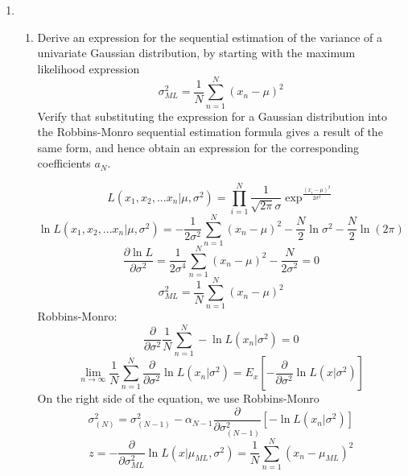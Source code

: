 \documentclass[a4paper]{article}
\begin{document}
\begin{enumerate}
		\item
		\begin{enumerate}
			\item
			Derive an expression for the sequential estimation of the variance of a univariate Gaussian distribution, by starting with the maximum likelihood expression
			$$
			\sigma_{ML}^2 = \frac{1}{N}\sum_{n=1}^{N}(x_n - \mu)^2
			$$
			Verify that substituting the expression for a Gaussian distribution into the Robbins-Monro sequential estimation formula gives a result of the same form, and hence obtain an expression for the corresponding coefficients $a_N$.
			\begin{solution}
				\begin{equation*}
					L(x_1,x_2,...x_n|\mu,\sigma^2)=\prod_{i=1}^{N}\frac{1}{\sqrt{2\pi}\sigma}\exp^{\frac{(x_i-\mu)^2}{2\sigma^2}}
				\end{equation*}
				\begin{equation*}
					\ln L(x_1,x_2,...x_n|\mu,\sigma^2)=-\frac{1}{2\sigma^2}\sum_{n=1}^{N}(x_n-\mu)^2-\frac{N}{2}\ln \sigma^2-\frac{N}{2}\ln (2\pi)
				\end{equation*}
				\begin{equation*}
					\frac{\partial \ln L}{\partial \sigma^2}=\frac{1}{2\sigma^4}\sum_{n=1}^{N}(x_n-\mu)^2-\frac{N}{2\sigma^2}=0
				\end{equation*}
				\begin{equation*}
					\sigma_{ML}^2=\frac{1}{N}\sum_{n=1}^{N}(x_n-\mu)^2
				\end{equation*}
				Robbins-Monro:
				\begin{equation*}
					\frac{\partial}{\partial \sigma^2}{\frac{1}{N}\sum_{n=1}^{N}-\ln L(x_n|\sigma^2)}=0
				\end{equation*}
				\begin{equation*}
					\lim\limits_{n \to \infty}\frac{1}{N}\sum_{n=1}^{N}\frac{\partial}{\partial \sigma^2}\ln L(x_n|\sigma^2)=E_x[-\frac{\partial}{\partial \sigma^2}\ln L(x|\sigma^2)]
				\end{equation*}
				On the right side of the equation, we use Robbins-Monro
				\begin{equation*}
					\sigma^2_{(N)}=\sigma^2_{(N-1)}-\alpha_{N-1}\frac{\partial}{\partial \sigma^2_{(N-1)}}[-\ln L(x_n|\sigma^2)]
				\end{equation*}
				\begin{equation*}
					z=-\frac{\partial}{\partial \sigma^2_{ML}}\ln L(x|\mu_{ML},\sigma^2)=\frac{1}{N}\sum_{n=1}^{N}(x_n-\mu_{ML})^2
				\end{equation*}

\end{solution}
\end{enumerate}
\end{enumerate}
\end{document}
